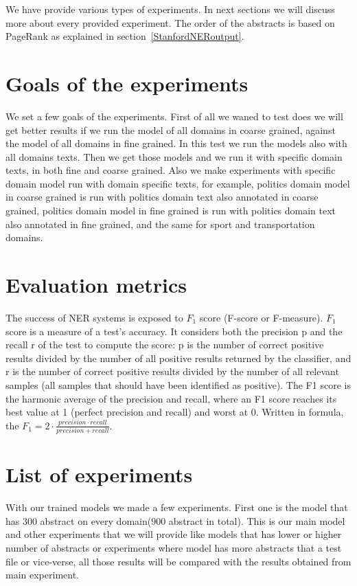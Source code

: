 \documentclass[thesis=M,english]{FITthesis}[2018/05/30]
\begin{document}
We have provide various types of experiments. In next sections we will discuss more about every provided experiment. The order of the abstracts is based on PageRank as explained in section~\ref{StanfordNERoutput}.

\section{Goals of the experiments}
	We set a few goals of the experiments. First of all we waned to test does we will get better results if we run the model of all domains in coarse grained, against the model of all domains in fine grained. In this test we run the models also with all domains texts. Then we get those models and we run it with specific domain texts, in both fine and coarse grained. Also we make experiments with specific domain model run with domain specific texts, for example, politics domain model in coarse grained is run with politics domain text also annotated in coarse grained, politics domain model in fine grained is run with politics domain text also annotated in fine grained, and the same for sport and transportation domains.

\section{Evaluation metrics}
	The success of NER systems is exposed to $F_{1}$ score (F-score or F-measure). $F_{1}$ \cite{wiki:F1} score  is a measure of a test's accuracy. It considers both the precision p  and the recall r of the test to compute the score: p is the number of correct positive results divided by the number of all positive results returned by the classifier, and r is the number of correct positive results divided by the number of all relevant samples (all samples that should have been identified as positive). The F1 score is the harmonic average of the precision and recall, where an F1 score reaches its best value at 1 (perfect precision and recall) and worst at 0. 
Written in formula, the $F_{1} =2\cdot \frac{precision \cdot recall}{precision + recall}$.


\section{List of experiments}
	With our trained models we made a few experiments. First one is the model that has 300 abstract on every domain(900 abstract in total). This is our main model and other experiments that we will provide like models that has lower or higher number of abstracts or experiments where model has more abstracts that a test file or vice-verse, all those results will be compared with the results obtained from main experiment. 
\end{document}
